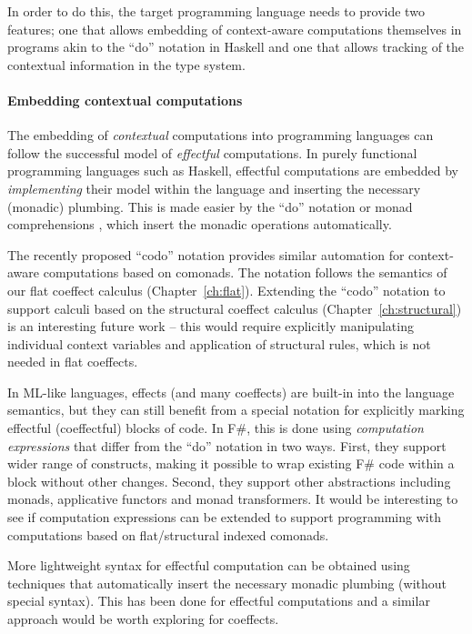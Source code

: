 In order to do this, the target programming language needs to provide two features; one that allows
embedding of context-aware computations themselves in programs akin to the ``do'' notation
in Haskell and one that allows tracking of the contextual information in the type system.


\paragraph{Embedding contextual computations}

The embedding of \emph{contextual} computations into programming languages can follow the successful
model of \emph{effectful} computations. In purely functional programming languages such as Haskell,
effectful computations are embedded by \emph{implementing} their model within the language
and inserting the necessary (monadic) plumbing. This is made easier by the ``do'' notation or
monad comprehensions \cite{other-haskell98,monads-compre}, which insert the monadic operations
automatically.

The recently proposed ``codo'' notation \cite{comonads-codo} provides similar automation for
context-aware computations based on comonads. The notation follows the semantics of our
flat coeffect calculus (Chapter~\ref{ch:flat}). Extending the ``codo'' notation to support calculi based
on the structural coeffect calculus (Chapter~\ref{ch:structural}) is an interesting future work --
this would require explicitly manipulating individual context variables and application of structural
rules, which is not needed in flat coeffects.

In ML-like languages, effects (and many coeffects) are built-in into the language semantics,
but they can still benefit from a special notation for explicitly marking effectful (coeffectful)
blocks of code. In F\#, this is done using \emph{computation expressions}  \cite{app-computation-zoo}
that differ from the ``do'' notation in two ways. First, they support wider range of
constructs, making it possible to wrap existing F\# code within a block without other changes.
Second, they support other abstractions including monads, applicative functors and monad
transformers. It would be interesting to see if computation expressions can be extended to
support programming with computations based on flat/structural indexed comonads.

More lightweight syntax for effectful computation can be obtained using
techniques that automatically insert the necessary monadic plumbing (without
special syntax). This has been done for effectful computations \cite{monads-lightweight-ml}
and a similar approach would be worth exploring for coeffects.

